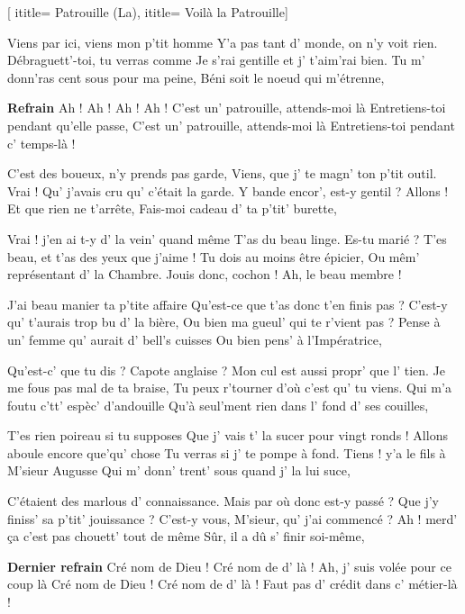  [
ititle= {Patrouille (La)},
ititle= {Voilà la Patrouille}]


\beginverse
Viens par ici, viens mon p'tit homme
Y'a pas tant d' monde, on n'y voit rien.
Débraguett'-toi, tu verras comme
Je s'rai gentille et j' t'aim'rai bien.
Tu m' donn'ras cent sous pour ma peine,
Béni soit le noeud qui m'étrenne,
\endverse

\beginchorus
\textbf {Refrain}
Ah ! Ah ! Ah ! Ah !
C'est un' patrouille, attends-moi là
Entretiens-toi pendant qu'elle passe,
C'est un' patrouille, attends-moi là
Entretiens-toi pendant c' temps-là !
\endchorus

\beginverse
C'est des boueux, n'y prends pas garde,
Viens, que j' te magn' ton p'tit outil.
Vrai ! Qu' j'avais cru qu' c'était la garde.
Y bande encor', est-y gentil ?
Allons ! Et que rien ne t'arrête,
Fais-moi cadeau d' ta p'tit' burette,
\endverse

\beginverse
Vrai ! j'en ai t-y d' la vein' quand même
T'as du beau linge. Es-tu marié ?
T'es beau, et t'as des yeux que j'aime !
Tu dois au moins être épicier,
Ou mêm' représentant d' la Chambre.
Jouis donc, cochon ! Ah, le beau membre !
\endverse

\beginverse
J'ai beau manier ta p'tite affaire
Qu'est-ce que t'as donc t'en finis pas ?
C'est-y qu' t'aurais trop bu d' la bière,
Ou bien ma gueul' qui te r'vient pas ?
Pense à un' femme qu' aurait d' bell's cuisses
Ou bien pens' à l'Impératrice,
\endverse

\beginverse
Qu'est-c' que tu dis ? Capote anglaise ?
Mon cul est aussi propr' que l' tien.
Je me fous pas mal de ta braise,
Tu peux r'tourner d'où c'est qu' tu viens.
Qui m'a foutu c'tt' espèc' d'andouille
Qu'à seul'ment rien dans l' fond d' ses couilles,
\endverse

\beginverse
T'es rien poireau si tu supposes
Que j' vais t' la sucer pour vingt ronds !
Allons aboule encore que'qu' chose
Tu verras si j' te pompe à fond.
Tiens ! y'a le fils à M'sieur Augusse
Qui m' donn' trent' sous quand j' la lui suce,
\endverse

\beginverse
C'étaient des marlous d' connaissance.
Mais par où donc est-y passé ?
Que j'y finiss' sa p'tit' jouissance ?
C'est-y vous, M'sieur, qu' j'ai commencé ?
Ah ! merd' ça c'est pas chouett' tout de même
Sûr, il a dû s' finir soi-même,
\endverse

\beginverse
\textbf {Dernier refrain}
Cré nom de Dieu ! Cré nom de d' là !
Ah, j' suis volée pour ce coup là
Cré nom de Dieu ! Cré nom de d' là !
Faut pas d' crédit dans c' métier-là !
\endverse

\endsong